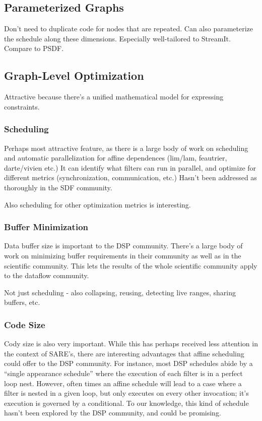 \subsection{Parameterized Graphs}

Don't need to duplicate code for nodes that are repeated.  Can also
parameterize the schedule along these dimensions.  Especially
well-tailored to StreamIt.  Compare to PSDF.

\subsection{Graph-Level Optimization}

Attractive because there's a unified mathematical model for expressing
constraints.

\subsubsection{Scheduling}

Perhaps most attractive feature, as there is a large body of work on
scheduling and automatic parallelization for affine dependences
(lim/lam, feautrier, darte/vivien etc.)  It can identify what filters
can run in parallel, and optimize for different metrics
(synchronization, communication, etc.)  Hasn't been addressed as
thoroughly in the SDF community.

Also scheduling for other optimization metrics is interesting.

\subsubsection{Buffer Minimization}

Data buffer size is important to the DSP community.  There's a large
body of work on minimizing buffer requirements in their community as
well as in the scientific community.  This lets the results of the
whole scientific community apply to the dataflow community.

Not just scheduling - also collapsing, reusing, detecting live ranges,
sharing buffers, etc.

\subsubsection{Code Size}

Cody size is also very important.  While this has perhaps received
less attention in the context of SARE's, there are interesting
advantages that affine scheduling could offer to the DSP community.
For instance, most DSP schedules abide by a ``single appearance
schedule'' where the execution of each filter is in a perfect loop
nest.  However, often times an affine schedule will lead to a case
where a filter is nested in a given loop, but only executes on every
other invocation; it's execution is governed by a conditional.  To our
knowledge, this kind of schedule hasn't been explored by the DSP
community, and could be promising.

